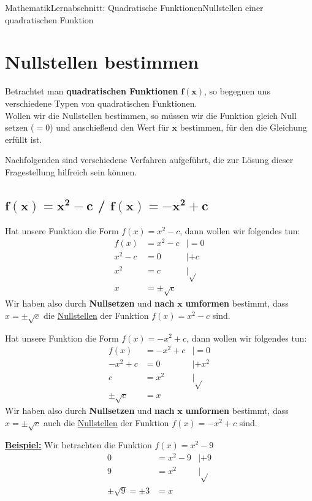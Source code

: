 \documentclass[11pt,twocolumn,oneside,openany,headings=optiontotoc,11pt,numbers=noenddot]{article}
\begin{document}
	\begin{worksheet}{Mathematik}{Lernabschnitt: Quadratische Funktionen}{Nullstellen einer quadratischen Funktion}
		\setcounter{section}{3}
		\section{Nullstellen bestimmen}
		Betrachtet  man \textbf{quadratischen Funktionen} \(\mathbf{f(x)}\), so begegnen uns verschiedene Typen von quadratischen Funktionen.\\
		Wollen wir die Nullstellen bestimmen, so müssen wir die Funktion gleich Null setzen (\(= 0\)) und anschießend den Wert für \(\mathbf{x}\) bestimmen, für den die Gleichung erfüllt ist.\\
		\par\noindent
		Nachfolgenden sind verschiedene Verfahren aufgeführt, die zur Lösung dieser Fragestellung hilfreich sein können.
		\subsection{\(\mathbf{f(x) = x^2 - c}\) / \(\mathbf{f(x) = -x^2 + c}\)}
		Hat unsere Funktion die Form \underline{\(f(x) = x^2 - c\)}, dann wollen wir folgendes tun:
		\begin{align*}
			f(x) & = x^2 - c & | = 0\\
			x^2 - c & = 0 & | +c\\
			x^2 & = c & | \sqrt{}\\
			x & = \pm\sqrt{c}
		\end{align*}
		Wir haben also durch \textbf{Nullsetzen} und \textbf{nach} \(\mathbf{x}\) \textbf{umformen} bestimmt, dass \colorbox{green!10}{\(x = \pm\sqrt{c}\)} die \underline{Nullstellen} der Funktion \(f(x) = x^2 - c\) sind.\\
		\par\noindent
		Hat unsere Funktion die Form \underline{\(f(x) = -x^2 + c\)}, dann wollen wir folgendes tun:
		\begin{align*}
			f(x) & = - x^2 + c & | = 0\\
			- x^2 + c & = 0 & | + x^2\\
			c & = x^2 & | \sqrt{}\\
			\pm\sqrt{c} & = x
		\end{align*}
		Wir haben also durch \textbf{Nullsetzen} und \textbf{nach} \(\mathbf{x}\) \textbf{umformen} bestimmt, dass \colorbox{green!10}{\(x = \pm\sqrt{c}\)} auch die \underline{Nullstellen} der Funktion \(f(x) = -x^2 + c\) sind.\\
		\par\noindent
		\textbf{\underline{Beispiel:}} Wir betrachten die Funktion \(f(x) = x^2 - 9\)
		\begin{align*}
			0 & = x^2 - 9 & |+9\\
			9 & = x^2 & |\sqrt{}\\
			\pm{}\sqrt{9} = \pm{}3 & = x
		\end{align*}

\end{worksheet}
\end{document}
